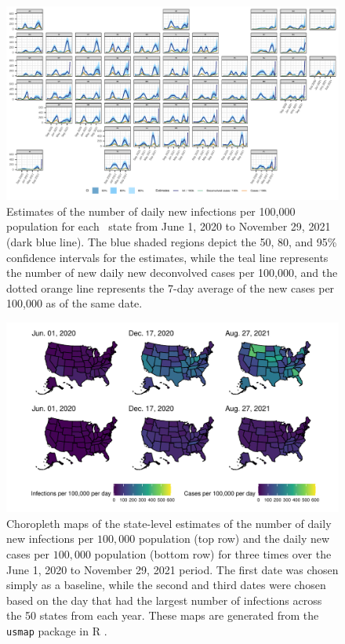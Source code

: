 \documentclass{article}
\begin{document}
\begin{landscape}
\thispagestyle{empty}
\begin{figure}[!tb]
    \centering
    \includegraphics[width=.99\linewidth]{state_niauc_est_faceted_F24.pdf} 
    \caption{Estimates of the number of daily new infections per
     100,000 population for each \US\ state from June 1, 2020 to November 29, 2021
      (dark blue line). The blue shaded regions depict the 50, 80, and 95\% confidence 
      intervals for the estimates, while the teal line represents the 
      number of new daily new deconvolved cases per 100,000, and the dotted 
      orange line represents the 7-day average of the new cases per 100,000 as 
      of the same date.}
    \label{fig:state_infect_est}
\fillandplacepagenumber
\end{figure}
\end{landscape}

\begin{figure}[!tb]
\centering
    \includegraphics[width=.99\textwidth]{choro_inf_case_rates_F24.pdf}
    \caption{Choropleth maps of the state-level estimates of the number of 
    daily new infections per $100,000$ population (top row) and the 
    daily new cases per $100,000$ population (bottom row) for three times
    over the June 1, 2020 to November 29, 2021 period. The first date was
     chosen simply as a baseline, while the second and third 
    dates were chosen based on the day that had the largest number of infections 
    across the 50 states from each year. 
    These maps are generated from the \texttt{usmap} 
    package in R \citep{lorenzo2023usmap}.} 
    \label{fig:choro_inf_case_rates}
\end{figure}
\end{document}
